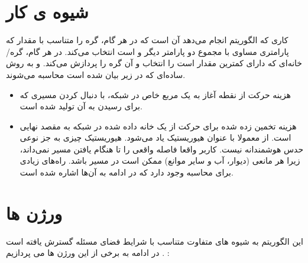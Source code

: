 \section{شیوه ی کار}
کاری که الگوریتم  انجام می‌دهد آن است که در هر گام، گره را متناسب با مقدار 
که پارامتری مساوی با مجموع دو پارامتر دیگر  و  است انتخاب می‌کند. در هر گام، گره/خانه‌ای که دارای کمترین مقدار است را انتخاب و آن گره را پردازش می‌کند.  و  به روش ساده‌ای که در زیر بیان شده است محاسبه می‌شوند.
\begin{itemize}
	\item{}
	 هزینه حرکت از نقطه آغاز به یک مربع خاص در شبکه، با دنبال کردن مسیری که برای رسیدن به آن تولید شده است.
		\item{}
		 هزینه تخمین زده شده برای حرکت از یک خانه داده شده در شبکه به مقصد نهایی است. از  معمولا با عنوان هیوریستیک یاد می‌شود. هیوریستیک چیزی به جز نوعی حدس هوشمندانه نیست. کاربر واقعا فاصله واقعی را تا هنگام یافتن مسیر نمی‌داند، زیرا هر مانعی (دیوار، آب و سایر موانع) ممکن است در مسیر باشد. راه‌های زیادی برای محاسبه  وجود دارد که در ادامه به آن‌ها اشاره شده است.
\end{itemize}


\section{ورژن ها}
این الگوریتم به شیوه های متفاوت متناسب با شرایط فضای مسئله گسترش یافته است . در ادامه به برخی از این ورژن ها می پردازیم :






